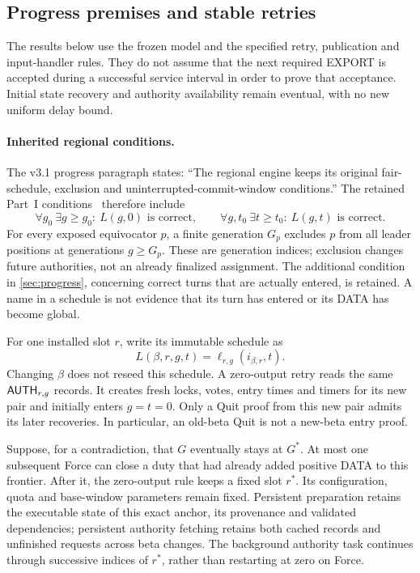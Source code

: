 \subsection{Progress premises and stable retries}
\label{sec:v35-progress-premises}
The results below use the frozen model and the specified retry,
publication and input-handler rules. They do not assume that the next
required EXPORT is accepted during a successful service interval in
order to prove that acceptance. Initial state recovery and authority
availability remain eventual, with no new uniform delay bound.

\paragraph{Inherited regional conditions.}
The v3.1 progress paragraph states: ``The regional engine keeps its
original fair-schedule, exclusion and uninterrupted-commit-window
conditions.'' The retained Part~I conditions~\cite{part1} therefore
include
\[
 \forall g_0\ \exists g\ge g_0:\ L(g,0)\text{ is correct},\qquad
 \forall g,t_0\ \exists t\ge t_0:\ L(g,t)\text{ is correct}.
\]
For every exposed equivocator $p$, a finite generation $G_p$ excludes
$p$ from all leader positions at generations $g\ge G_p$. These are
generation indices; exclusion changes future authorities, not an
already finalized assignment. The additional condition in
\cref{sec:progress}, concerning correct turns that are actually entered,
is retained. A name in a schedule is not evidence that its turn has
entered or its DATA has become global.

For one installed slot $r$, write its immutable schedule as
\[
 L(\beta,r,g,t)=\ell_{r,g}(i_{\beta,r},t).
\]
Changing $\beta$ does not reseed this schedule. A zero-output retry reads
the same $\mathsf{AUTH}_{r,g}$ records. It creates fresh locks, votes,
entry times and timers for its new pair and initially enters $g=t=0$.
Only a Quit proof from this new pair admits its later recoveries.
In particular, an old-beta Quit is not a new-beta entry proof.

Suppose, for a contradiction, that $G$ eventually stays at $G^*$.
At most one subsequent Force can close a duty that had already added
positive DATA to this frontier. After it, the zero-output rule keeps a
fixed slot $r^*$. Its configuration, quota and base-window parameters
remain fixed. Persistent preparation retains the executable state of
this exact anchor, its provenance and validated dependencies; persistent
authority fetching retains both cached records and unfinished requests
across beta changes. The background authority task continues through
successive indices of $r^*$, rather than restarting at zero on Force.

